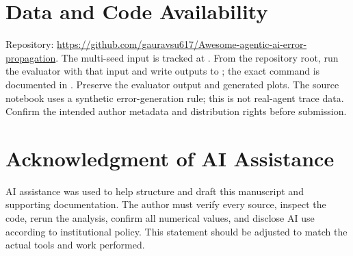 \documentclass[conference]{IEEEtran}
\begin{document}
\section*{Data and Code Availability}
Repository: \url{https://github.com/gauravsu617/Awesome-agentic-ai-error-propagation}. The multi-seed input is tracked at . From the repository root, run the evaluator with that input and write outputs to ; the exact command is documented in . Preserve the evaluator output and generated plots. The source notebook uses a synthetic error-generation rule; this is not real-agent trace data. Confirm the intended author metadata and distribution rights before submission.

\section*{Acknowledgment of AI Assistance}
AI assistance was used to help structure and draft this manuscript and supporting documentation. The author must verify every source, inspect the code, rerun the analysis, confirm all numerical values, and disclose AI use according to institutional policy. This statement should be adjusted to match the actual tools and work performed.



\end{document}
